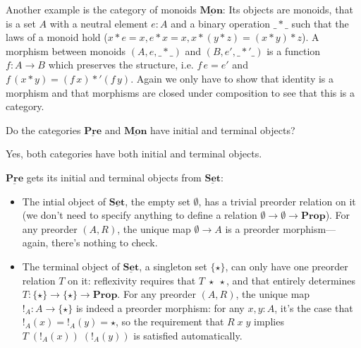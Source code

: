 \documentclass{article}
\newcommand{\Prop}{\mathbf{Prop}}
\newcommand{\cat}[1]{\underline{\mathbf{#1}}}
\begin{document}
Another example is the category of monoids $\cat{Mon}$: Its objects are monoids, that is a set $A$ with a neutral element $e:A$ and a binary operation $\_*\_$ such that the laws of a monoid hold ($x*e=x, e*x=x, x*(y*z) = (x*y)*z$). A morphism between monoids $(A,e, \_*\_)$ and $(B,e',\_*'\_)$ is a function $f : A \to B$ which preserves the structure, i.e. $f\,e = e'$ and $f\,(x * y) = (f\,x) *' (f\, y)$. Again we only have to show that identity is a morphism and that morphisms are closed under composition to see that this is a category.

\begin{Exercise}
  Do the categories $\cat{Pre}$ and $\cat{Mon}$ have initial and terminal objects?
\end{Exercise}
\begin{Answer}
  Yes, both categories have both initial and terminal objects. 
  
  $\cat{Pre}$ gets its initial and terminal objects from $\cat{Set}$:
  \begin{itemize}
    \item The intial object of $\cat{Set}$, the empty set $\emptyset$, has a trivial preorder relation on it (we don't need to specify anything to define a relation $\emptyset \to \emptyset \to \Prop$). For any preorder $(A,R)$, the unique map $\emptyset \to A$ is a preorder morphism---again, there's nothing to check.
    \item The terminal object of $\cat{Set}$, a singleton set $\{\star\}$, can only have one preorder relation $T$ on it: reflexivity requires that $T\;\star\;\star$, and that entirely determines $T\colon\{\star\}\to\{\star\}\to\Prop$. For any preorder $(A,R)$, the unique map $!_A\colon A\to\{\star\}$ is indeed a preorder morphism: for any $x,y\colon A$, it's the case that $!_A(x)=!_A(y)=\star$, so the requirement that $R\;x\;y$ implies $T\;(!_A(x))\;(!_A(y))$ is satisfied automatically.
  \end{itemize}


\end{Answer}
\end{document}
